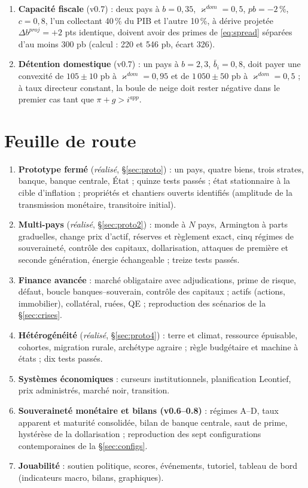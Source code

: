 \documentclass[11pt,a4paper]{article}
\begin{document}
\begin{enumerate}
\item \textbf{Capacité fiscale} (v0.7) : deux pays à $b=0{,}35$, $\varkappa^{dom}=0{,}5$, $pb=-2\,\%$, $c=0{,}8$, l'un collectant 40\,\% du PIB et l'autre 10\,\%, à dérive projetée $\Delta b^{proj}=+2$ pts identique, doivent avoir des primes de \eqref{eq:spread} séparées d'au moins 300 pb (calcul : 220 et 546 pb, écart 326).
\item \textbf{Détention domestique} (v0.7) : un pays à $b=2{,}3$, $\bar b_i=0{,}8$, doit payer une convexité de $105\pm10$ pb à $\varkappa^{dom}=0{,}95$ et de $1\,050\pm50$ pb à $\varkappa^{dom}=0{,}5$ ; à taux directeur constant, la boule de neige doit rester négative dans le premier cas tant que $\pi+g>i^{app}$.
\end{enumerate}

\section{Feuille de route}
\begin{enumerate}
\item \textbf{Prototype fermé} (\emph{réalisé}, \S\ref{sec:proto}) : un pays, quatre biens, trois strates, banque, banque centrale, État ; quinze tests passés ; état stationnaire à la cible d'inflation ; propriétés et chantiers ouverts identifiés (amplitude de la transmission monétaire, transitoire initial).
\item \textbf{Multi-pays} (\emph{réalisé}, \S\ref{sec:proto2}) : monde à $N$ pays, Armington à parts graduelles, change prix d'actif, réserves et règlement exact, cinq régimes de souveraineté, contrôle des capitaux, dollarisation, attaques de première et seconde génération, énergie échangeable ; treize tests passés.
\item \textbf{Finance avancée} : marché obligataire avec adjudications, prime de risque, défaut, boucle banques--souverain, contrôle des capitaux ; actifs (actions, immobilier), collatéral, ruées, QE ; reproduction des scénarios de la \S\ref{sec:crises}.
\item \textbf{Hétérogénéité} (\emph{réalisé}, \S\ref{sec:proto4}) : terre et climat, ressource épuisable, cohortes, migration rurale, archétype agraire ; règle budgétaire et machine à états ; dix tests passés.
\item \textbf{Systèmes économiques} : curseurs institutionnels, planification Leontief, prix administrés, marché noir, transition.
\item \textbf{Souveraineté monétaire et bilans (v0.6--0.8)} : régimes A--D, taux apparent et maturité consolidée, bilan de banque centrale, saut de prime, hystérèse de la dollarisation ; reproduction des sept configurations contemporaines de la \S\ref{sec:configs}.
\item \textbf{Jouabilité} : soutien politique, scores, événements, tutoriel, tableau de bord (indicateurs macro, bilans, graphiques).
\end{enumerate}
\end{document}

